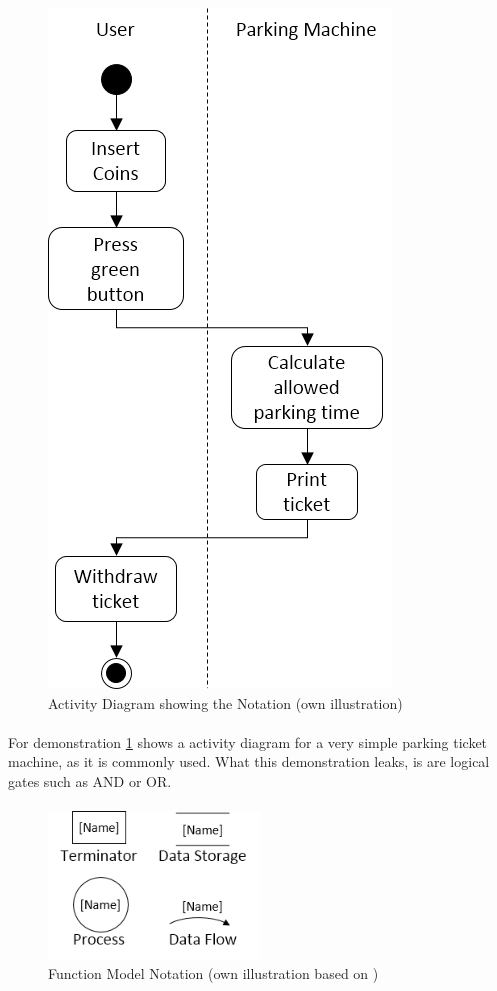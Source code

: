 \begin{figure}
    \centering
    \includegraphics[scale=0.9]{img/activityDiagram.png}
    \caption[Example Activity Diagram]{Activity Diagram showing the Notation (own illustration)}
    \label{fig:adEx}
\end{figure}

\paragraph{} For demonstration \cref{fig:adEx} shows a activity diagram for a very simple parking ticket machine, as it is commonly used. What this demonstration leaks, is are logical gates such as AND or OR.

\paragraph{} 
\begin{figure}[H]
    \centering
    \includegraphics[width=0.5\textwidth]{img/fmSymb.png}
    \caption[Function Model Notation]{Function Model Notation (own illustration based on \cite[190]{Pohl.2007})}
    \label{fig:fmSymb}
\end{figure}


